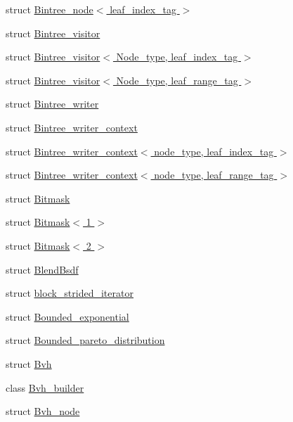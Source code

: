 \begin{DoxyCompactItemize}
\item 
struct \hyperlink{structcugar_1_1_bintree__node_3_01leaf__index__tag_01_4}{Bintree\+\_\+node$<$ leaf\+\_\+index\+\_\+tag $>$}
\item 
struct \hyperlink{structcugar_1_1_bintree__visitor}{Bintree\+\_\+visitor}
\item 
struct \hyperlink{structcugar_1_1_bintree__visitor_3_01_node__type_00_01leaf__index__tag_01_4}{Bintree\+\_\+visitor$<$ Node\+\_\+type, leaf\+\_\+index\+\_\+tag $>$}
\item 
struct \hyperlink{structcugar_1_1_bintree__visitor_3_01_node__type_00_01leaf__range__tag_01_4}{Bintree\+\_\+visitor$<$ Node\+\_\+type, leaf\+\_\+range\+\_\+tag $>$}
\item 
struct \hyperlink{structcugar_1_1_bintree__writer}{Bintree\+\_\+writer}
\item 
struct \hyperlink{structcugar_1_1_bintree__writer__context}{Bintree\+\_\+writer\+\_\+context}
\item 
struct \hyperlink{structcugar_1_1_bintree__writer__context_3_01node__type_00_01leaf__index__tag_01_4}{Bintree\+\_\+writer\+\_\+context$<$ node\+\_\+type, leaf\+\_\+index\+\_\+tag $>$}
\item 
struct \hyperlink{structcugar_1_1_bintree__writer__context_3_01node__type_00_01leaf__range__tag_01_4}{Bintree\+\_\+writer\+\_\+context$<$ node\+\_\+type, leaf\+\_\+range\+\_\+tag $>$}
\item 
struct \hyperlink{structcugar_1_1_bitmask}{Bitmask}
\item 
struct \hyperlink{structcugar_1_1_bitmask_3_011_01_4}{Bitmask$<$ 1 $>$}
\item 
struct \hyperlink{structcugar_1_1_bitmask_3_012_01_4}{Bitmask$<$ 2 $>$}
\item 
struct \hyperlink{structcugar_1_1_blend_bsdf}{Blend\+Bsdf}
\item 
struct \hyperlink{structcugar_1_1block__strided__iterator}{block\+\_\+strided\+\_\+iterator}
\item 
struct \hyperlink{structcugar_1_1_bounded__exponential}{Bounded\+\_\+exponential}
\item 
struct \hyperlink{structcugar_1_1_bounded__pareto__distribution}{Bounded\+\_\+pareto\+\_\+distribution}
\item 
struct \hyperlink{structcugar_1_1_bvh}{Bvh}
\item 
class \hyperlink{classcugar_1_1_bvh__builder}{Bvh\+\_\+builder}
\item 
struct \hyperlink{structcugar_1_1_bvh__node}{Bvh\+\_\+node}

\end{DoxyCompactItemize}
